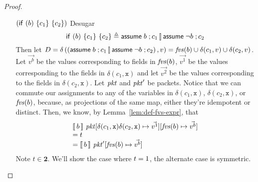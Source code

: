 \begin{proof}
\begin{enumerate}[align=left]
  \item[$(\mathsf{if}~(b)~\{c_1\}~\{c_2\})$] Desugar
    \[\mathsf{if}~(b)~\{c_1\}~\{c_2\} \triangleq\mathsf{assume}\; b\;; c_1 \operatorname*{\left[\!\right]} \mathsf{assume}\; \neg
        b\;; c_2\] Then let
    $D = \delta\left(\left(\mathsf{assume}\; b\;; c_1 \operatorname*{\left[\!\right]} \mathsf{assume}\; \neg b\;;
        c_2\right),v\right) = \mathit{fvs}(b) \cup \delta(c_1,v) \cup
    \delta(c_2,v)$. Let $\vec{v^b}$ be the values corresponding to
    fields in $\mathit{fvs}(b)$, $\vec{v^1}$ be the values corresponding to
    the fields in $\delta(c_1,\texttt{x})$ and let $\vec{v^2}$ be the
    values corresponding to the fields in
    $\delta(c_2,\texttt{x})$. Let $\mathit{pkt}$ and $\mathit{pkt}'$ be
    packets. Notice that we can commute our assignments to any of the
    variables in $\delta(c_1,\texttt{x})$, $\delta(c_2,\texttt{x})$,
    or $\mathit{fvs}(b)$, because, as projections of the same map, either
    they're idempotent or distinct. Then, we know, by
    Lemma~\ref{lem:def-fvs-expr}, that
    \[\begin{array}l
        \bracbb{b}~\pkt[\delta(c_1,\texttt{x})\delta(c_2,\texttt{x})
        \mapsto \vec{v^1}][\fvs(b) \mapsto \vec{v^b}] \\
        = t\\
        =  \bracbb{b}~\pkt'[\fvs(b) \mapsto \vec{v^b}]
      \end{array}\]
    Note $t \in \mathbf 2$. We'll show the case where $t = 1$, the
    alternate case is symmetric.


\end{enumerate}
\end{proof}
